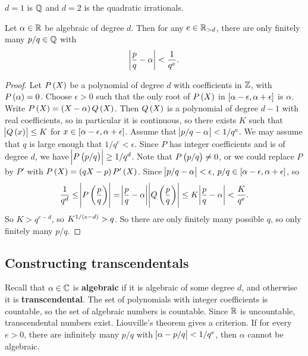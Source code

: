 \begin{example*}
$ d = 1 $ is $ \mathbb{Q} $ and $ d = 2 $ is the quadratic irrationals.
\end{example*}

\begin{theorem}
Let $ \alpha \in \mathbb{R} $ be algebraic of degree $ d $. Then for any $ e \in \mathbb{R}_{> d} $, there are only finitely many $ p / q \in \mathbb{Q} $ with
$$ \abs{\dfrac{p}{q} - \alpha} < \dfrac{1}{q^e}. $$
\end{theorem}

\begin{proof}
Let $ P\br{X} $ be a polynomial of degree $ d $ with coefficients in $ \mathbb{Z} $, with $ P\br{\alpha} = 0 $. Choose $ \epsilon > 0 $ such that the only root of $ P\br{X} $ in $ \sbr{\alpha - \epsilon, \alpha + \epsilon} $ is $ \alpha $. Write $ P\br{X} = \br{X - \alpha}Q\br{X} $. Then $ Q\br{X} $ is a polynomial of degree $ d - 1 $ with real coefficients, so in particular it is continuous, so there exists $ K $ such that $ \abs{Q\br{x}} \le K $ for $ x \in \sbr{\alpha - \epsilon, \alpha + \epsilon} $. Assume that $ \abs{p / q - \alpha} < 1 / q^e $. We may assume that $ q $ is large enough that $ 1 / q^e < \epsilon $. Since $ P $ has integer coefficients and is of degree $ d $, we have $ \abs{P\br{p / q}} \ge 1 / q^d $. Note that $ P\br{p / q} \ne 0 $, or we could replace $ P $ by $ P' $ with $ P\br{X} = \br{qX - p}P'\br{X} $. Since $ \abs{p / q - \alpha} < \epsilon $, $ p / q \in \sbr{\alpha - \epsilon, \alpha + \epsilon} $, so
$$ \dfrac{1}{q^d} \le \abs{P\br{\dfrac{p}{q}}} = \abs{\dfrac{p}{q} - \alpha} \abs{Q\br{\dfrac{p}{q}}} \le K \abs{\dfrac{p}{q} - \alpha} < \dfrac{K}{q^e}. $$
So $ K > q^{e - d} $, so $ K^{1 / \br{e - d}} > q $. So there are only finitely many possible $ q $, so only finitely many $ p / q $.
\end{proof}

\subsection{Constructing transcendentals}

Recall that $ \alpha \in \mathbb{C} $ is \textbf{algebraic} if it is algebraic of some degree $ d $, and otherwise it is \textbf{transcendental}. The set of polynomials with integer coefficients is countable, so the set of algebraic numbers is countable. Since $ \mathbb{R} $ is uncountable, transcendental numbers exist. Liouville's theorem gives a criterion. If for every $ e > 0 $, there are infinitely many $ p / q $ with $ \abs{\alpha - p / q} < 1 / q^e $, then $ \alpha $ cannot be algebraic.

